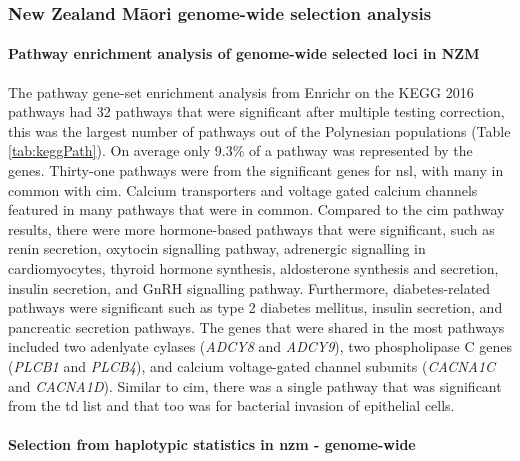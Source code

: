 \documentclass[]{report}
\let\oldparagraph\paragraph
\renewcommand{\paragraph}[1]{\oldparagraph{#1}\mbox{}}
\newcommand{\tex}[1]{#1}
\begin{document}
\subsubsection{\texorpdfstring{New Zealand M\tex{\={a}}ori genome-wide
selection
analysis}{New Zealand Mori genome-wide selection analysis}}\label{new-zealand-mori-genome-wide-selection-analysis}

\paragraph{Pathway enrichment analysis of genome-wide selected loci in
NZM}\label{nzmPath}

The pathway gene-set enrichment analysis from Enrichr on the KEGG 2016
pathways had 32 pathways that were significant after multiple testing
correction, this was the largest number of pathways out of the
Polynesian populations (Table \ref{tab:keggPath}). On average only 9.3\%
of a pathway was represented by the genes. Thirty-one pathways were from
the significant genes for \gls{nsl}, with many in common with \gls{cim}.
Calcium transporters and voltage gated calcium channels featured in many
pathways that were in common. Compared to the \gls{cim} pathway results,
there were more hormone-based pathways that were significant, such as
renin secretion, oxytocin signalling pathway, adrenergic signalling in
cardiomyocytes, thyroid hormone synthesis, aldosterone synthesis and
secretion, insulin secretion, and GnRH signalling pathway. Furthermore,
diabetes-related pathways were significant such as type 2 diabetes
mellitus, insulin secretion, and pancreatic secretion pathways. The
genes that were shared in the most pathways included two adenlyate
cylases (\emph{ADCY8} and \emph{ADCY9}), two phospholipase C genes
(\emph{PLCB1} and \emph{PLCB4}), and calcium voltage-gated channel
subunits (\emph{CACNA1C} and \emph{CACNA1D}). Similar to \gls{cim},
there was a single pathway that was significant from the \gls{td} list
and that too was for bacterial invasion of epithelial cells.

\paragraph{\texorpdfstring{Selection from haplotypic statistics in
\gls{nzm} -
genome-wide}{Selection from haplotypic statistics in  - genome-wide}}\label{selection-from-haplotypic-statistics-in---genome-wide}
\end{document}
